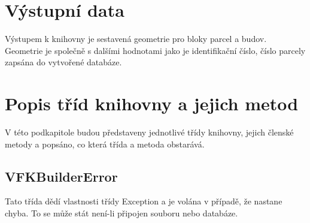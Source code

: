 \section{Výstupní data}
Výstupem k knihovny je sestavená geometrie pro bloky parcel a budov. Geometrie je společně s dalšími hodnotami jako je identifikační číslo, číslo parcely zapsána do vytvořené databáze.
\section{Popis tříd knihovny a jejich metod}
V této podkapitole budou představeny jednotlivé třídy knihovny, jejich členské metody a popsáno, co která třída a metoda obstarává.
\subsection{VFKBuilderError}
Tato třída dědí vlastnosti třídy Exception a je volána v případě, že nastane chyba. To se může stát není-li připojen  souboru nebo databáze.
